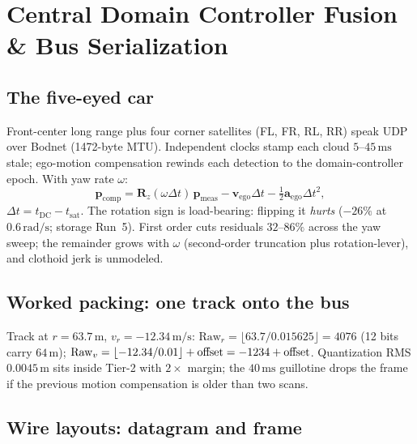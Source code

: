 \documentclass[11pt,oneside]{book}
\begin{document}
\chapter{Central Domain Controller Fusion \& Bus Serialization}
\label{ch:fusion}

\section{The five-eyed car}
\label{sec:five-eyes}

Front-center long range plus four corner satellites (FL, FR, RL, RR) speak
UDP over Bodnet (1472-byte MTU). Independent clocks stamp each cloud
$5$--$45\,\mathrm{ms}$ stale; ego-motion compensation rewinds each
detection to the domain-controller epoch. With yaw rate $\omega$:
\begin{equation}
\boxed{\mathbf{p}_{\mathrm{comp}}
= \mathbf{R}_z(\omega\Delta t)\,\mathbf{p}_{\mathrm{meas}}
- \mathbf{v}_{\mathrm{ego}}\Delta t - \tfrac12\mathbf{a}_{\mathrm{ego}}\Delta t^2,}
\label{eq:deskew}
\end{equation}
$\Delta t=t_{\mathrm{DC}}-t_{\mathrm{sat}}$. The rotation sign is
load-bearing: flipping it \emph{hurts} ($-26\%$ at $0.6\,\mathrm{rad/s}$;
storage Run~5). First order cuts residuals $32$--$86\%$ across the yaw
sweep; the remainder grows with $\omega$ (second-order truncation plus
rotation-lever), and clothoid jerk is unmodeled.

\section{Worked packing: one track onto the bus}
\label{sec:dbc-numbers}

Track at $r=63.7\,\mathrm{m}$, $v_r=-12.34\,\mathrm{m/s}$:
$\mathrm{Raw}_r=\lfloor63.7/0.015625\rfloor=4076$ (12 bits carry $64\,\mathrm{m}$);
$\mathrm{Raw}_v=\lfloor-12.34/0.01\rfloor+{\rm offset}=-1234+{\rm offset}$.
Quantization RMS $0.0045\,\mathrm{m}$ sits inside Tier-2 with $2\times$
margin; the $40\,\mathrm{ms}$ guillotine drops the frame if the previous
motion compensation is older than two scans.

\section{Wire layouts: datagram and frame}
\label{sec:wire-layout}
\end{document}

